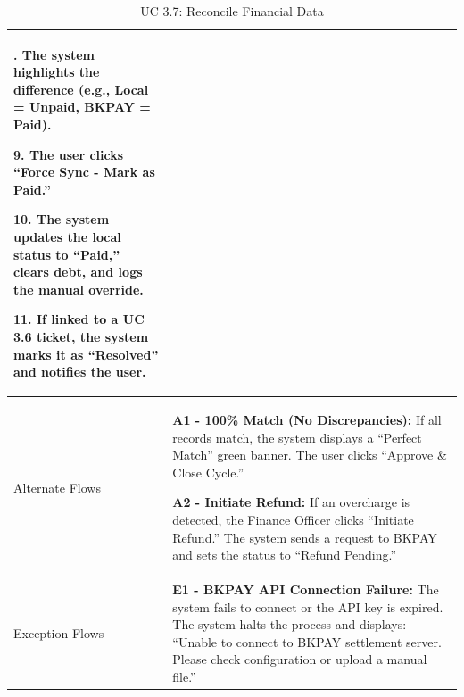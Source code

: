 \begin{table}[H]
\begin{tabularx}{\textwidth}{|>{\raggedright\arraybackslash}p{3.5cm}|>{\RaggedRight\arraybackslash}X|}
8. The system highlights the difference (e.g., Local = Unpaid, BKPAY = Paid). \par
9. The user clicks ``Force Sync - Mark as Paid.'' \par
10. The system updates the local status to ``Paid,'' clears debt, and logs the manual override. \par
11. If linked to a UC 3.6 ticket, the system marks it as ``Resolved'' and notifies the user. \\
\hline
Alternate Flows & 
\textbf{A1 - 100\% Match (No Discrepancies):} If all records match, the system displays a ``Perfect Match'' green banner. The user clicks ``Approve \& Close Cycle.'' \par \vspace{0.5em}
\textbf{A2 - Initiate Refund:} If an overcharge is detected, the Finance Officer clicks ``Initiate Refund.'' The system sends a request to BKPAY and sets the status to ``Refund Pending.'' \\
\hline
Exception Flows & 
\textbf{E1 - BKPAY API Connection Failure:} The system fails to connect or the API key is expired. The system halts the process and displays: ``Unable to connect to BKPAY settlement server. Please check configuration or upload a manual file.'' \par \vspace{0.5em}
\hline
\end{tabularx}
\caption{UC 3.7: Reconcile Financial Data}
\label{tab:uc3.7}
\end{table}
